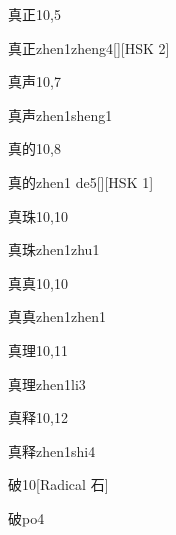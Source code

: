 \begin{entry}{真正}{10,5}
  \begin{phonetics}{真正}{zhen1zheng4}[][HSK 2]
  \end{phonetics}
\end{entry}

\begin{entry}{真声}{10,7}
  \begin{phonetics}{真声}{zhen1sheng1}
  \end{phonetics}
\end{entry}

\begin{entry}{真的}{10,8}
  \begin{phonetics}{真的}{zhen1 de5}[][HSK 1]
  \end{phonetics}
\end{entry}

\begin{entry}{真珠}{10,10}
  \begin{phonetics}{真珠}{zhen1zhu1}
  \end{phonetics}
\end{entry}

\begin{entry}{真真}{10,10}
  \begin{phonetics}{真真}{zhen1zhen1}
  \end{phonetics}
\end{entry}

\begin{entry}{真理}{10,11}
  \begin{phonetics}{真理}{zhen1li3}
  \end{phonetics}
\end{entry}

\begin{entry}{真释}{10,12}
  \begin{phonetics}{真释}{zhen1shi4}
  \end{phonetics}
\end{entry}

\begin{entry}{破}{10}[Radical 石]
  \begin{phonetics}{破}{po4}
  \end{phonetics}
\end{entry}

